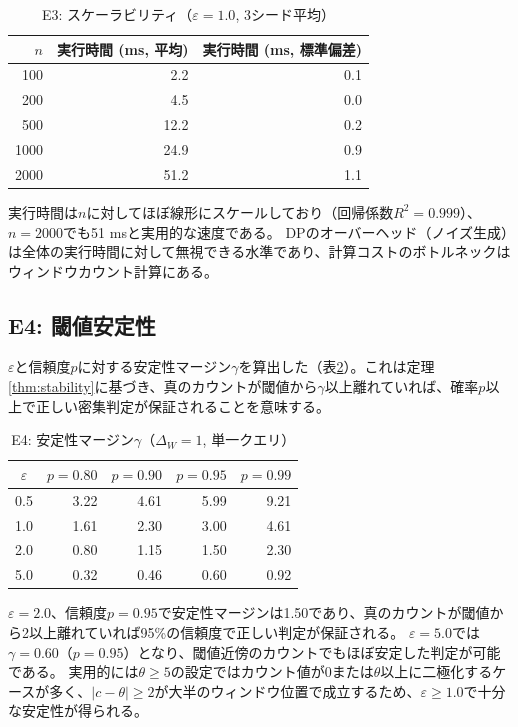\begin{table}[t]
\centering
\caption{E3: スケーラビリティ（$\varepsilon = 1.0$, 3シード平均）}
\label{tab:e3}
\begin{tabular}{rrr}
\toprule
$n$ & 実行時間 (ms, 平均) & 実行時間 (ms, 標準偏差) \\
\midrule
100   & 2.2  & 0.1 \\
200   & 4.5  & 0.0 \\
500   & 12.2 & 0.2 \\
1000  & 24.9 & 0.9 \\
2000  & 51.2 & 1.1 \\
\bottomrule
\end{tabular}
\end{table}

実行時間は$n$に対してほぼ線形にスケールしており（回帰係数$R^2 = 0.999$）、$n = 2000$でも51 msと実用的な速度である。
DPのオーバーヘッド（ノイズ生成）は全体の実行時間に対して無視できる水準であり、計算コストのボトルネックはウィンドウカウント計算にある。

\subsection{E4: 閾値安定性}

$\varepsilon$と信頼度$p$に対する安定性マージン$\gamma$を算出した（表\ref{tab:e4}）。これは定理\ref{thm:stability}に基づき、真のカウントが閾値から$\gamma$以上離れていれば、確率$p$以上で正しい密集判定が保証されることを意味する。

\begin{table}[t]
\centering
\caption{E4: 安定性マージン$\gamma$（$\Delta_W = 1$, 単一クエリ）}
\label{tab:e4}
\begin{tabular}{crrrr}
\toprule
$\varepsilon$ & $p = 0.80$ & $p = 0.90$ & $p = 0.95$ & $p = 0.99$ \\
\midrule
0.5 & 3.22 & 4.61 & 5.99 & 9.21 \\
1.0 & 1.61 & 2.30 & 3.00 & 4.61 \\
2.0 & 0.80 & 1.15 & 1.50 & 2.30 \\
5.0 & 0.32 & 0.46 & 0.60 & 0.92 \\
\bottomrule
\end{tabular}
\end{table}

$\varepsilon = 2.0$、信頼度$p = 0.95$で安定性マージンは1.50であり、真のカウントが閾値から2以上離れていれば95\%の信頼度で正しい判定が保証される。
$\varepsilon = 5.0$では$\gamma = 0.60$（$p = 0.95$）となり、閾値近傍のカウントでもほぼ安定した判定が可能である。
実用的には$\theta \geq 5$の設定ではカウント値が0または$\theta$以上に二極化するケースが多く、$|c - \theta| \geq 2$が大半のウィンドウ位置で成立するため、$\varepsilon \geq 1.0$で十分な安定性が得られる。

